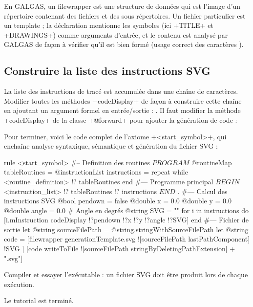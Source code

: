 En GALGAS, un filewrapper est une structure de données qui est l'image d'un répertoire contenant des fichiers et des sous répertoires. Un fichier particulier est un template ; la déclaration mentionne les symboles (ici \ggs+TITLE+ et \ggs+DRAWINGS+) comme arguments d'entrée, et le contenu est analysé par GALGAS de façon à vérifier qu'il est bien formé (usage correct des caractères \tpp{\%}).

\subsection{Construire la liste des instructions SVG}
La liste des instructions de tracé est accumulée dans une chaîne de caractères. Modifier toutes les méthodes \ggs+codeDisplay+ de façon à construire cette chaîne en ajoutant un argument formel en entrée/sortie : . Il faut modifier la méthode \ggs+codeDisplay+ de la classe \ggs+@forward+ pour ajouter la génération de code :


Pour terminer, voici le code complet de l’axiome \ggs+<start_symbol>+, qui enchaîne analyse syntaxique, sémantique et génération du fichier SVG :
\begin{galgas}
rule <start_symbol> {
#-- Definition des routines
  $PROGRAM$
  @routineMap tableRoutines = {}
  @instructionList instructions = {}
  repeat
  while
    <routine_definition> !? tableRoutines
  end
#--- Programme principal
  $BEGIN$
  <instruction_list> !? tableRoutines !? instructions
  $END$
  $.$
#--- Calcul des instructions SVG
  @bool pendown = false
  @double x = 0.0
  @double y = 0.0
  @double angle = 0.0 # Angle en degrés
  @string SVG = ""
  for i in instructions do
    [i.mInstruction codeDisplay !?pendown !?x !?y !?angle !?SVG]
  end
#--- Fichier de sortie
  let @string sourceFilePath = @string.stringWithSourceFilePath
  let @string code = [filewrapper generationTemplate.svg
    ![sourceFilePath lastPathComponent]
    !SVG
  ]
  [code writeToFile ![sourceFilePath stringByDeletingPathExtension] + ".svg"]
}
\end{galgas}

Compiler et essayer l'exécutable : un fichier SVG doit être produit lors de chaque exécution.

Le tutorial est terminé.
